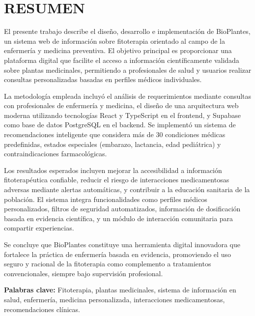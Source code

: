 \documentclass[12pt,a4paper]{article}
\begin{document}
\section*{RESUMEN}

El presente trabajo describe el diseño, desarrollo e implementación de BioPlantes, un sistema web de información sobre fitoterapia orientado al campo de la enfermería y medicina preventiva. El objetivo principal es proporcionar una plataforma digital que facilite el acceso a información científicamente validada sobre plantas medicinales, permitiendo a profesionales de salud y usuarios realizar consultas personalizadas basadas en perfiles médicos individuales.

La metodología empleada incluyó el análisis de requerimientos mediante consultas con profesionales de enfermería y medicina, el diseño de una arquitectura web moderna utilizando tecnologías React y TypeScript en el frontend, y Supabase como base de datos PostgreSQL en el backend. Se implementó un sistema de recomendaciones inteligente que considera más de 30 condiciones médicas predefinidas, estados especiales (embarazo, lactancia, edad pediátrica) y contraindicaciones farmacológicas.

Los resultados esperados incluyen mejorar la accesibilidad a información fitoterapéutica confiable, reducir el riesgo de interacciones medicamentosas adversas mediante alertas automáticas, y contribuir a la educación sanitaria de la población. El sistema integra funcionalidades como perfiles médicos personalizados, filtros de seguridad automatizados, información de dosificación basada en evidencia científica, y un módulo de interacción comunitaria para compartir experiencias.

Se concluye que BioPlantes constituye una herramienta digital innovadora que fortalece la práctica de enfermería basada en evidencia, promoviendo el uso seguro y racional de la fitoterapia como complemento a tratamientos convencionales, siempre bajo supervisión profesional.

\textbf{Palabras clave:} Fitoterapia, plantas medicinales, sistema de información en salud, enfermería, medicina personalizada, interacciones medicamentosas, recomendaciones clínicas.

\vspace{1cm}

\newpage
\tableofcontents
\end{document}
